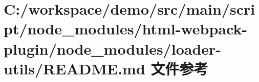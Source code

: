 \hypertarget{node__modules_2html-webpack-plugin_2node__modules_2loader-utils_2_r_e_a_d_m_e_8md}{}\section{C\+:/workspace/demo/src/main/script/node\+\_\+modules/html-\/webpack-\/plugin/node\+\_\+modules/loader-\/utils/\+R\+E\+A\+D\+ME.md 文件参考}
\label{node__modules_2html-webpack-plugin_2node__modules_2loader-utils_2_r_e_a_d_m_e_8md}
